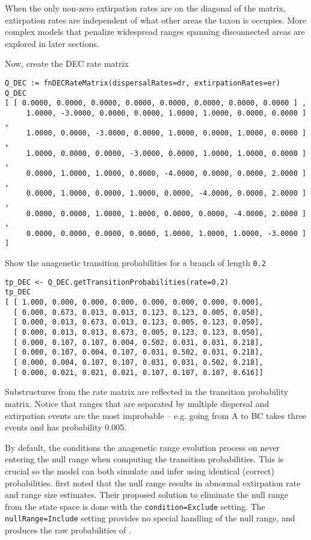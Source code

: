 When the only non-zero extirpation rates are on the diagonal of the matrix, extirpation rates are independent of what other areas the taxon is occupies.
More complex models that penalize widespread ranges spanning disconnected areas are explored in later sections.

Now, create the DEC rate matrix

\begin{snugshade}
\begin{lstlisting}
Q_DEC := fnDECRateMatrix(dispersalRates=dr, extirpationRates=er)
Q_DEC
[ [ 0.0000, 0.0000, 0.0000, 0.0000, 0.0000, 0.0000, 0.0000, 0.0000 ] ,
     1.0000, -3.0000, 0.0000, 0.0000, 1.0000, 1.0000, 0.0000, 0.0000 ] ,
     1.0000, 0.0000, -3.0000, 0.0000, 1.0000, 0.0000, 1.0000, 0.0000 ] ,
     1.0000, 0.0000, 0.0000, -3.0000, 0.0000, 1.0000, 1.0000, 0.0000 ] ,
     0.0000, 1.0000, 1.0000, 0.0000, -4.0000, 0.0000, 0.0000, 2.0000 ] ,
     0.0000, 1.0000, 0.0000, 1.0000, 0.0000, -4.0000, 0.0000, 2.0000 ] ,
     0.0000, 0.0000, 1.0000, 1.0000, 0.0000, 0.0000, -4.0000, 2.0000 ] ,
     0.0000, 0.0000, 0.0000, 0.0000, 1.0000, 1.0000, 1.0000, -3.0000 ] ]
\end{lstlisting}
\end{snugshade}

Show the anagenetic transition probabilities for a branch of length {\tt 0.2}

\begin{snugshade}
\begin{lstlisting}
tp_DEC <- Q_DEC.getTransitionProbabilities(rate=0.2)
tp_DEC
[ [ 1.000, 0.000, 0.000, 0.000, 0.000, 0.000, 0.000, 0.000],
  [ 0.000, 0.673, 0.013, 0.013, 0.123, 0.123, 0.005, 0.050],
  [ 0.000, 0.013, 0.673, 0.013, 0.123, 0.005, 0.123, 0.050],
  [ 0.000, 0.013, 0.013, 0.673, 0.005, 0.123, 0.123, 0.050],
  [ 0.000, 0.107, 0.107, 0.004, 0.502, 0.031, 0.031, 0.218],
  [ 0.000, 0.107, 0.004, 0.107, 0.031, 0.502, 0.031, 0.218],
  [ 0.000, 0.004, 0.107, 0.107, 0.031, 0.031, 0.502, 0.218],
  [ 0.000, 0.021, 0.021, 0.021, 0.107, 0.107, 0.107, 0.616]]
\end{lstlisting}
\end{snugshade}

Substructures from the rate matrix are reflected in the transition probability matrix.
Notice that ranges that are separated by multiple dispersal and extirpation events are the most improbable -- e.g. going from A to BC takes three events and has probability 0.005.

By default, the \RevBayes conditions the anagenetic range evolution process on never entering the null range when computing the transition probabilities.
This is crucial so the model can both simulate and infer using identical (correct) probabilities.
\citet{massana15} first noted that the null range results in abnormal extirpation rate and range size estimates.
Their proposed solution to eliminate the null range from the state space is done with the {\tt condition=Exclude} setting. 
The {\tt nullRange=Include} setting provides no special handling of the null range, and produces the raw probabilities of \citet{ree05}.

